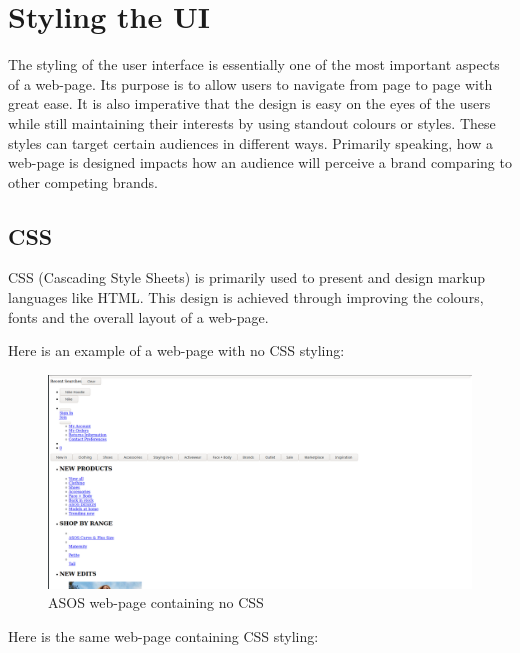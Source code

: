 \section{Styling the UI}
The styling of the user interface is essentially one of the most important aspects of a web-page. Its purpose is to allow users to navigate from page to page with great ease. It is also imperative that the design is easy on the eyes of the users while still maintaining their interests by using standout colours or styles. These styles can target certain audiences in different ways. Primarily speaking, how a web-page is designed impacts how an audience will perceive a brand comparing to other competing brands.

\newpage
\subsection{CSS}
CSS (Cascading Style Sheets) is primarily used to present and design markup languages like HTML. This design is achieved through improving the colours, fonts and the overall layout of a web-page.

Here is an example of a web-page with no CSS styling:

\begin{figure}[h]
    \centering
    \includegraphics[scale=0.2]{img/nocss.png}
    \caption{ASOS web-page containing no CSS}
    \label{fig:my_label}
\end{figure}

Here is the same web-page containing CSS styling:

